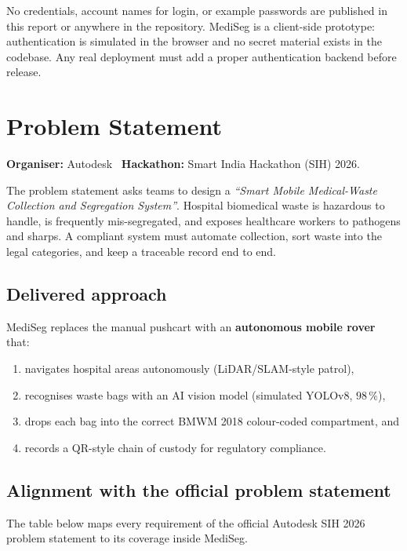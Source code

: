 \documentclass[11pt, a4paper]{article}
\begin{document}
\begin{privacybox}
No credentials, account names for login, or example passwords are published in
this report or anywhere in the repository. MediSeg is a client-side prototype:
authentication is simulated in the browser and no secret material exists in the
codebase. Any real deployment must add a proper authentication backend before
release.
\end{privacybox}

\section{Problem Statement}

\textbf{Organiser:} Autodesk \textperiodcentered\ \textbf{Hackathon:} Smart
India Hackathon (SIH) 2026.

The problem statement asks teams to design a
\textit{``Smart Mobile Medical-Waste Collection and Segregation System''}.
Hospital biomedical waste is hazardous to handle, is frequently mis-segregated,
and exposes healthcare workers to pathogens and sharps. A compliant system must
automate collection, sort waste into the legal categories, and keep a traceable
record end to end.

\subsection{Delivered approach}
MediSeg replaces the manual pushcart with an \textbf{autonomous mobile rover} that:
\begin{enumerate}[leftmargin=1.6em, itemsep=2pt]
  \item navigates hospital areas autonomously (LiDAR/SLAM-style patrol),
  \item recognises waste bags with an AI vision model (simulated YOLOv8, $98\,\%$),
  \item drops each bag into the correct BMWM 2018 colour-coded compartment, and
  \item records a QR-style chain of custody for regulatory compliance.
\end{enumerate}

\subsection{Alignment with the official problem statement}
The table below maps every requirement of the official Autodesk SIH 2026
problem statement to its coverage inside MediSeg.
\end{document}
